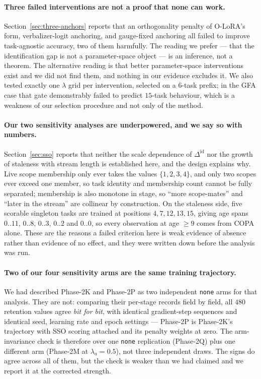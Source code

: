 \paragraph{Three failed interventions are not a proof that none can work.}
Section~\ref{sec:three-anchors} reports that an orthogonality penalty of O-LoRA's
form, verbalizer-logit anchoring, and gauge-fixed anchoring all failed to improve
task-agnostic accuracy, two of them harmfully. The reading we prefer --- that the
identification gap is not a parameter-space object --- is an inference, not a
theorem. The alternative reading is that better parameter-space interventions exist
and we did not find them, and nothing in our evidence excludes it. We also tested
exactly one $\lambda$ grid per intervention, selected on a $6$-task prefix; in the
GFA case that gate demonstrably failed to predict $15$-task behaviour, which is a
weakness of our selection procedure and not only of the method.

\paragraph{Our two sensitivity analyses are underpowered, and we say so with numbers.}
Section~\ref{sec:sso} reports that neither the scale dependence of
$\Delta^{\mathrm{id}}$ nor the growth of staleness with stream length is established
here, and the design explains why. Live scope membership only ever takes the values
$\{1,2,3,4\}$, and only two scopes ever exceed one member, so task identity and
membership count cannot be fully separated; membership is also monotone in stage, so
``more scope-mates'' and ``later in the stream'' are collinear by construction. On
the staleness side, five scorable singleton tasks are trained at positions
$4,7,12,13,15$, giving age spans $0..11$, $0..8$, $0..3$, $0..2$ and $0..0$, so every
observation at age $\ge9$ comes from COPA alone. These are the reasons a failed
criterion here is weak evidence of absence rather than evidence of no effect, and
they were written down before the analysis was run.

\paragraph{Two of our four sensitivity arms are the same training trajectory.}
We had described Phase-2K and Phase-2P as two independent \texttt{none} arms for that
analysis. They are not: comparing their per-stage records field by field, all $480$
retention values agree \emph{bit for bit}, with identical gradient-step sequences and
identical seed, learning rate and epoch settings --- Phase-2P is Phase-2K's trajectory
with SSO scoring attached and its penalty weights at zero. The arm-invariance check is
therefore over one \texttt{none} replication (Phase-2Q) plus one different arm
(Phase-2M at $\lambda_a=0.5$), not three independent draws. The signs do agree across
all of them, but the check is weaker than we had claimed and we report it at the
corrected strength.

